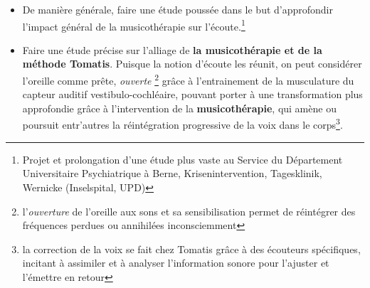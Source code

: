 \begin{itemize}
      
       
\item De manière générale, faire une étude poussée dans le but d'approfondir l'impact général de la
  musicothérapie sur l'écoute.\footnote{ Projet et 
  prolongation d'une étude plus vaste au Service du
  Département Universitaire Psychiatrique à Berne, Krisenintervention,
  Tagesklinik, Wernicke (Inselspital, UPD) }
   \item
     Faire une étude précise sur l'alliage de \textbf{la
       musicothérapie et de la méthode Tomatis}. Puisque la notion d'écoute les réunit, on
     peut considérer l'oreille comme 
prête, \textit{ouverte} \footnote{l'\emph{ouverture} de l'oreille
aux sons et sa sensibilisation permet de réintégrer
des fréquences perdues ou annihilées inconsciemment} grâce à l'entrainement de la musculature du capteur auditif
vestibulo-cochléaire, pouvant 
porter à une transformation plus approfondie grâce à l'intervention de la \textbf{musicothérapie}, qui amène
ou poursuit entr'autres la réintégration progressive de la voix  dans
le corps\footnote{ la correction de
la voix se fait chez Tomatis grâce à des écouteurs spécifiques, incitant à
assimiler et à analyser l'information sonore pour l'ajuster et
l'émettre en retour }.



\end{itemize}

